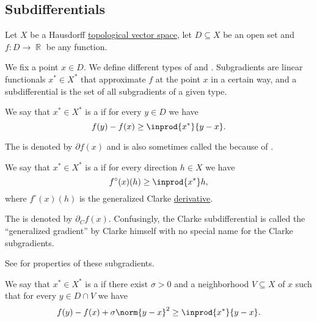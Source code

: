\subsection{Subdifferentials}\label{subsec:subdifferentials}

Let \( X \) be a Hausdorff \hyperref[def:topological_vector_space]{topological vector space}, let \( D \subseteq X \) be an open set and \( f: D \to \BbbR \) be any function.

\begin{definition}\label{def:subdifferentials}
  We fix a point \( x \in D \). We define different types of  and . Subgradients are linear functionals \( x^* \in X^* \) that approximate \( f \) at the point \( x \) in a certain way, and a subdifferential is the set of all subgradients of a given type.

  \begin{defenum}
    \mcite\cite[59]{Clarke2013}We say that \( x^* \in X^* \) is a  if for every \( y \in D \) we have
    \begin{equation*}
      f(y) - f(x) \geq \inprod {x^*} {y - x}.
    \end{equation*}

    The  is denoted by \( \partial f(x) \) and is also sometimes called the  because of .

    \mcite\cite[def. 10.3]{Clarke2013}We say that \( x^* \in X^* \) is a  if for every direction \( h \in X \) we have
    \begin{equation*}
      f^\circ(x)(h) \geq \inprod {x^*} h,
    \end{equation*}
    where \( f^\circ(x)(h) \) is the generalized Clarke \hyperref[def:nonsmooth_derivatives/clarke]{derivative}.

    The  is denoted by \( \partial_C f(x) \). Confusingly, the Clarke subdifferential is called the \enquote{generalized gradient} by Clarke himself with no special name for the Clarke subgradients.

    See  for properties of these subgradients.

    \mcite\cite[227]{Clarke2013}We say that \( x^* \in X^* \) is a  if there exist \( \sigma > 0 \) and a neighborhood \( V \subseteq X \) of \( x \) such that for every \( y \in D \cap V \) we have
    \begin{equation*}
      f(y) - f(x) + \sigma \norm{y - x}^2 \geq \inprod {x^*} {y - x}.
    \end{equation*}


\end{defenum}
\end{definition}
